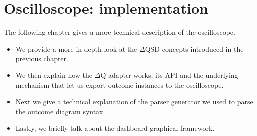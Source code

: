 \chapter{Oscilloscope: implementation}
    The following chapter gives a more technical description of the oscilloscope.
    \begin{itemize} 
        \item We provide a more in-depth look at the $\Delta$QSD concepts introduced in the previous chapter.
        \item We then explain how the $\Delta$Q adapter works, its API and the underlying mechanism that let us export outcome instances to the oscilloscope.
        \item Next we give a technical explanation of the parser generator we used to parse the outcome diagram syntax.
        \item Lastly, we briefly talk about the dashboard graphical framework.
    \end{itemize}

    
    
    
    
